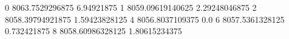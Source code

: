 0 8063.7529296875 6.94921875
1 8059.09619140625 2.29248046875
2 8058.39794921875 1.59423828125
4 8056.8037109375 0.0
6 8057.5361328125 0.732421875
8 8058.60986328125 1.80615234375
